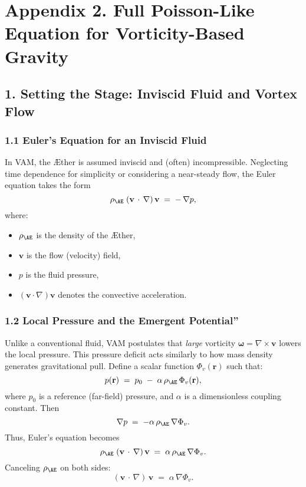 
\section*{Appendix 2. Full Poisson-Like Equation for Vorticity-Based Gravity}

\subsection*{1. Setting the Stage: Inviscid Fluid and Vortex Flow}

\subsubsection*{1.1 Euler's Equation for an Inviscid Fluid}
In VAM, the Æther is assumed inviscid and (often) incompressible. Neglecting time dependence for simplicity or considering a near-steady flow, the Euler equation takes the form
\[
    \rho_{\mathrm{\AE}}\;(\mathbf{v}\,\cdot\,\nabla)\,\mathbf{v}
    \;=\;
    -\,\nabla p,
\]
where:
\begin{itemize}
    \item \(\rho_{\mathrm{\AE}}\) is the density of the Æther,
    \item \(\mathbf{v}\) is the flow (velocity) field,
    \item \(p\) is the fluid pressure,
    \item \((\mathbf{v}\cdot\nabla)\mathbf{v}\) denotes the convective acceleration.
\end{itemize}

\subsubsection*{1.2 Local Pressure and the Emergent \grqq Potential\textquotedblright}
Unlike a conventional fluid, VAM postulates that \textit{large} vorticity \(\boldsymbol{\omega} = \nabla \times \mathbf{v}\) lowers the local pressure. This pressure deficit acts similarly to how mass density generates gravitational pull. Define a scalar function \(\Phi_v(\mathbf{r})\) such that:
\[
    p(\mathbf{r})
    \;=\;
    p_0 \;-\; \alpha \,\rho_{\mathrm{\AE}}\,\Phi_v(\mathbf{r}),
\]
where \(p_0\) is a reference (far-field) pressure, and \(\alpha\) is a dimensionless coupling constant. Then
\[
    \nabla p
    \;=\;
    -\alpha \,\rho_{\mathrm{\AE}} \,\nabla \Phi_v.
\]
Thus, Euler's equation becomes
\[
    \rho_{\mathrm{\AE}}\;(\mathbf{v}\,\cdot\,\nabla)\,\mathbf{v}
    \;=\;
    \alpha\,\rho_{\mathrm{\AE}}\,\nabla \Phi_v.
\]
Canceling \(\rho_{\mathrm{\AE}}\) on both sides:
\[
    (\mathbf{v}\,\cdot\,\nabla)\,\mathbf{v}
    \;=\;
    \alpha\,\nabla \Phi_v.
    \tag{1}
\]

